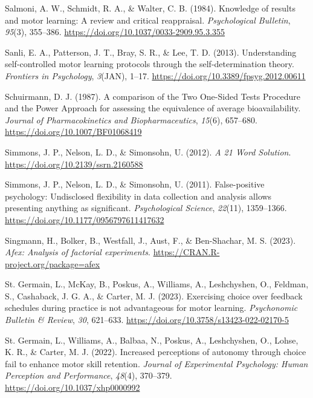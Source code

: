 \documentclass[
  man, donotrepeattitle,mask,floatsintext]{apa7}
\newlength{\cslhangindent}
\newlength{\cslentryspacingunit} %
\newenvironment{CSLReferences}[2] %
 {%
  \setlength{\parindent}{0pt}
  \ifodd #1
  \let\oldpar\par
  \def\par{\hangindent=\cslhangindent\oldpar}
  \fi
  \setlength{\parskip}{#2\cslentryspacingunit}
 }%
 {}
\begin{document}
\begin{CSLReferences}{1}{0}
\leavevmode{}%
Salmoni, A. W., Schmidt, R. A., \& Walter, C. B. (1984). Knowledge of results and motor learning: A review and critical reappraisal. \emph{Psychological Bulletin}, \emph{95}(3), 355--386. \url{https://doi.org/10.1037/0033-2909.95.3.355}

\leavevmode{}%
Sanli, E. A., Patterson, J. T., Bray, S. R., \& Lee, T. D. (2013). Understanding self-controlled motor learning protocols through the self-determination theory. \emph{Frontiers in Psychology}, \emph{3}(JAN), 1--17. \url{https://doi.org/10.3389/fpsyg.2012.00611}

\leavevmode{}%
Schuirmann, D. J. (1987). A comparison of the {Two One-Sided Tests Procedure} and the {Power Approach} for assessing the equivalence of average bioavailability. \emph{Journal of Pharmacokinetics and Biopharmaceutics}, \emph{15}(6), 657--680. \url{https://doi.org/10.1007/BF01068419}

\leavevmode{}%
Simmons, J. P., Nelson, L. D., \& Simonsohn, U. (2012). \emph{A 21 {Word Solution}}. \url{https://doi.org/10.2139/ssrn.2160588}

\leavevmode{}%
Simmons, J. P., Nelson, L. D., \& Simonsohn, U. (2011). False-positive psychology: {Undisclosed} flexibility in data collection and analysis allows presenting anything as significant. \emph{Psychological Science}, \emph{22}(11), 1359--1366. \url{https://doi.org/10.1177/0956797611417632}

\leavevmode{}%
Singmann, H., Bolker, B., Westfall, J., Aust, F., \& Ben-Shachar, M. S. (2023). \emph{Afex: Analysis of factorial experiments}. \url{https://CRAN.R-project.org/package=afex}

\leavevmode{}%
St. Germain, L., McKay, B., Poskus, A., Williams, A., Leshchyshen, O., Feldman, S., Cashaback, J. G. A., \& Carter, M. J. (2023). Exercising choice over feedback schedules during practice is not advantageous for motor learning. \emph{Psychonomic Bulletin \& Review}, \emph{30}, 621--633. \url{https://doi.org/10.3758/s13423-022-02170-5}

\leavevmode{}%
St. Germain, L., Williams, A., Balbaa, N., Poskus, A., Leshchyshen, O., Lohse, K. R., \& Carter, M. J. (2022). Increased perceptions of autonomy through choice fail to enhance motor skill retention. \emph{Journal of Experimental Psychology: Human Perception and Performance}, \emph{48}(4), 370--379. \url{https://doi.org/10.1037/xhp0000992}


\end{CSLReferences}
\end{document}
